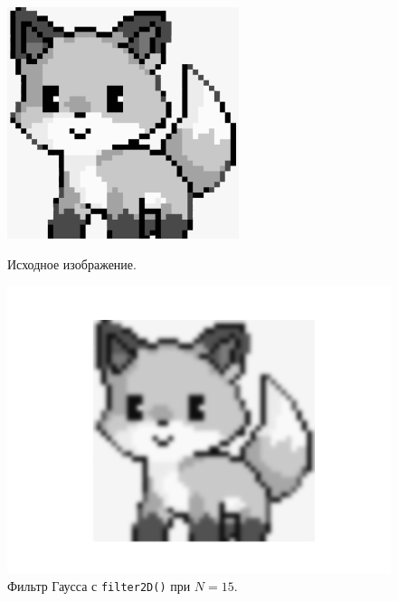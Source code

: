 \documentclass[a4paper]{article}
\begin{document}
\begin{figure}[H]
  \centering
  \begin{minipage}{0.49\textwidth}
    \centering
    \includegraphics[width=\textwidth]{src/grayscale.png}
    \caption{Исходное изображение.}  
  \end{minipage}
  \begin{minipage}{0.49\textwidth}
    \centering
    \includegraphics[width=\textwidth]{src/gauss_15.png}
    \caption{Фильтр Гаусса с \texttt{filter2D()} при $N=15$.}
  \end{minipage}
\end{figure}
\end{document}

